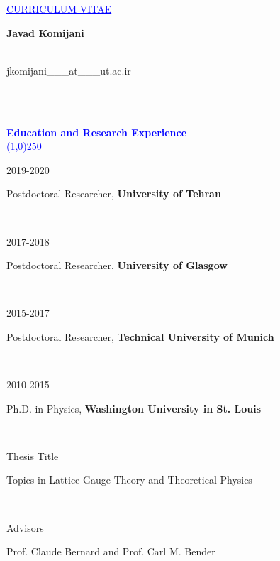 \documentclass[a4paper,10pt]{article}
\newcommand{\miniLeft}[1]{\begin{minipage}[t]{0.15\textwidth} {#1} \end{minipage}}
\newcommand{\miniRight}[1]{\begin{minipage}[t]{0.85\textwidth} {#1} \end{minipage} \\}
\newcommand{\mini}[2]{\miniLeft{#1} \miniRight{#2}}
\newcommand{\Section}[1]{\linethickness{0.8mm} \textcolor{blue}{\\ {\textbf{#1}} \vspace{-3mm} \\  \line(1,0){250}} 
\\ }
\begin{document}

\vspace{-.1cm}
\par{\centering\textcolor{blue}{ \underline{CURRICULUM VITAE}\\}} %


\vspace{0.7cm} %


{\large \textbf{Javad Komijani}} \\

\vspace{-5mm}
\begin{minipage}[t]{0.40\textwidth} 
{\ }\\
{jkomijani\_\_\_at\_\_\_ut.ac.ir}
\end{minipage}
\begin{minipage}[t]{0.60\textwidth} 
\begin{flushright}
{ }
\end{flushright}
\end{minipage} \\

\vspace{0.5cm} %

\Section{Education and Research Experience}


\mini{2019-2020}{{Postdoctoral Researcher}, \textbf{University of Tehran}}

\mini{2017-2018}{{Postdoctoral Researcher}, \textbf{University of Glasgow}}

\mini{2015-2017}{{Postdoctoral Researcher}, \textbf{Technical University of Munich}}

\mini{2010-2015}{{Ph.D. in Physics}, \textbf{Washington University in St. Louis}}
\mini{Thesis Title}{Topics in Lattice Gauge Theory and Theoretical Physics}
\mini{Advisors}{Prof. Claude Bernard and Prof. Carl M. Bender}
\end{document}
